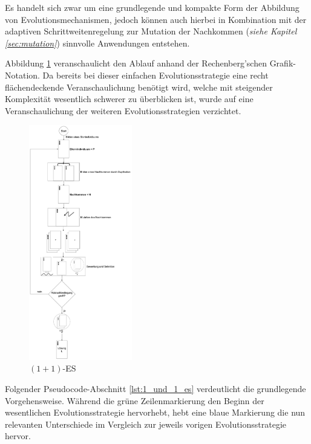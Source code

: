 Es handelt sich zwar um eine grundlegende und kompakte Form der Abbildung von Evolutionsmechanismen, jedoch können auch hierbei in Kombination mit der adaptiven Schrittweitenregelung zur Mutation der Nachkommen (\textit{siehe Kapitel \ref{sec:mutation}}) sinnvolle Anwendungen entstehen.

Abbildung \ref{fig:1_und_1_es} veranschaulicht den Ablauf anhand der Rechenberg'schen Grafik-Notation. Da bereits bei dieser einfachen Evolutionsstrategie eine recht flächendeckende Veranschaulichung benötigt wird, welche mit steigender Komplexität wesentlich schwerer zu überblicken ist, wurde auf eine Veranschaulichung der weiteren Evolutionsstrategien verzichtet. 

\begin{figure}[H]
\centering
\includegraphics[width=0.4\textwidth]{img/1_und_1_es.pdf}
\caption{$(1+1)$-ES}
\label{fig:1_und_1_es}
\end{figure}

Folgender Pseudocode-Abschnitt \ref{lst:1_und_1_es} verdeutlicht die grundlegende Vorgehensweise. Während die grüne Zeilenmarkierung den Beginn der wesentlichen Evolutionsstrategie hervorhebt, hebt eine blaue Markierung die nun relevanten Unterschiede im Vergleich zur jeweils vorigen Evolutionsstrategie hervor.

